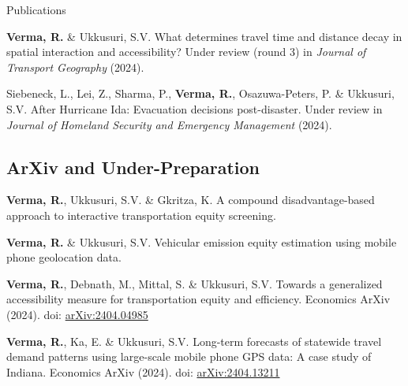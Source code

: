 \documentclass{CV} %
\begin{document}
\begin{rSection}{Publications}
\begin{etaremune}
        \item \textbf{Verma, R.} \& Ukkusuri, S.V. What determines travel time and distance decay in spatial interaction and accessibility? Under review (round 3) in \textit{Journal of Transport Geography} (2024).
        
        \item Siebeneck, L., Lei, Z., Sharma, P., \textbf{Verma, R.}, Osazuwa-Peters, P. \& Ukkusuri, S.V. After Hurricane Ida: Evacuation decisions post-disaster. Under review in \textit{Journal of Homeland Security and Emergency Management} (2024).
    \end{etaremune}

    \subsection*{ArXiv and Under-Preparation}
    \begin{etaremune}
        \item \textbf{Verma, R.}, Ukkusuri, S.V. \& Gkritza, K. A compound disadvantage-based approach to interactive transportation equity screening.
        
        \item \textbf{Verma, R.} \& Ukkusuri, S.V. Vehicular emission equity estimation using mobile phone geolocation data.
        
        \item \textbf{Verma, R.}, Debnath, M., Mittal, S. \& Ukkusuri, S.V. Towards a generalized accessibility measure for transportation equity and efficiency. Economics ArXiv (2024). doi: \href{https://arxiv.org/abs/2404.04985}{arXiv:2404.04985}
    
        \item \textbf{Verma, R.}, Ka, E. \& Ukkusuri, S.V. Long-term forecasts of statewide travel demand patterns using large-scale mobile phone GPS data: A case study of Indiana. Economics ArXiv (2024). doi: \href{https://arxiv.org/abs/2404.13211}{arXiv:2404.13211}
    \end{etaremune}
\end{rSection}
\end{document}
